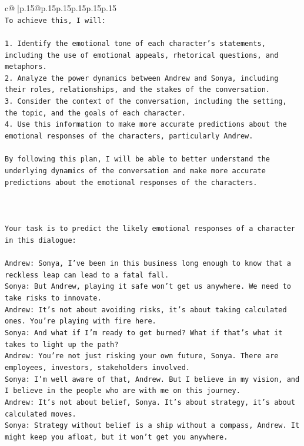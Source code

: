 \documentclass{article}
\begin{document}
{\begin{supertabular}{c@{$\;$}|p{.15\linewidth}@{}p{.15\linewidth}p{.15\linewidth}p{.15\linewidth}p{.15\linewidth}p{.15\linewidth}}
{{{\\ 
\texttt{To achieve this, I will:} \\
\\ 
\texttt{1. Identify the emotional tone of each character's statements, including the use of emotional appeals, rhetorical questions, and metaphors.} \\
\texttt{2. Analyze the power dynamics between Andrew and Sonya, including their roles, relationships, and the stakes of the conversation.} \\
\texttt{3. Consider the context of the conversation, including the setting, the topic, and the goals of each character.} \\
\texttt{4. Use this information to make more accurate predictions about the emotional responses of the characters, particularly Andrew.} \\
\\ 
\texttt{By following this plan, I will be able to better understand the underlying dynamics of the conversation and make more accurate predictions about the emotional responses of the characters.} \\
\\ 
\\ 
\\ 
\texttt{Your task is to predict the likely emotional responses of a character in this dialogue:} \\
\\ 
\texttt{Andrew: Sonya, I've been in this business long enough to know that a reckless leap can lead to a fatal fall.} \\
\texttt{Sonya: But Andrew, playing it safe won't get us anywhere. We need to take risks to innovate.} \\
\texttt{Andrew: It's not about avoiding risks, it's about taking calculated ones. You're playing with fire here.} \\
\texttt{Sonya: And what if I'm ready to get burned? What if that's what it takes to light up the path?} \\
\texttt{Andrew: You're not just risking your own future, Sonya. There are employees, investors, stakeholders involved.} \\
\texttt{Sonya: I'm well aware of that, Andrew. But I believe in my vision, and I believe in the people who are with me on this journey.} \\
\texttt{Andrew: It's not about belief, Sonya. It's about strategy, it's about calculated moves.} \\
\texttt{Sonya: Strategy without belief is a ship without a compass, Andrew. It might keep you afloat, but it won't get you anywhere.} \\
}}}
\end{supertabular}}
\end{document}
